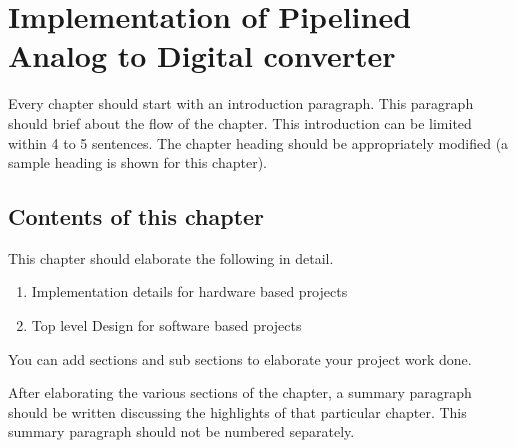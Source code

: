 \chapter{Implementation of Pipelined Analog to Digital converter}

\indent\indent Every chapter should start with an introduction paragraph. This paragraph should brief about the flow of the chapter. This introduction can be limited within 4 to 5 sentences. The chapter heading should be appropriately modified (a sample heading is shown for this chapter). 

\section{Contents of this chapter}
This chapter should elaborate the following in detail.
\begin{enumerate}
\item Implementation details for hardware based projects
\item Top level Design for software based projects
\end{enumerate}

You can add sections and sub sections to elaborate your project work done.

\vspace{0.75cm}

After elaborating the various sections of the chapter, a summary paragraph should be written discussing the highlights of that particular chapter. This summary paragraph should not be numbered separately.  


